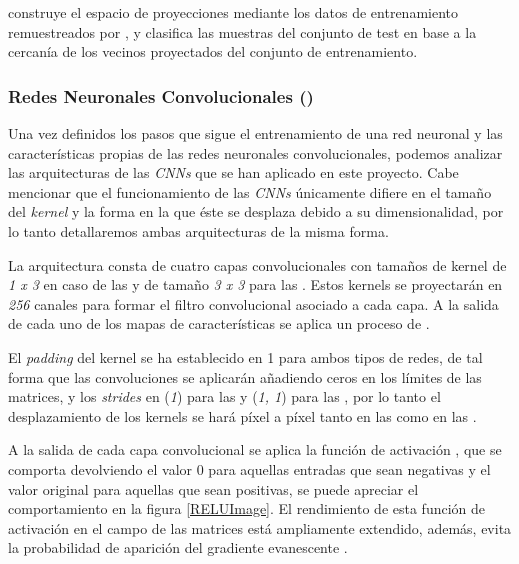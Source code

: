              construye el espacio de proyecciones mediante los datos de entrenamiento remuestreados por , y clasifica las muestras del conjunto de test en base a la cercanía de los vecinos proyectados del conjunto de entrenamiento.


        \subsubsection{Redes Neuronales Convolucionales ()}

            Una vez definidos los pasos que sigue el entrenamiento de una red neuronal y las características propias de las redes neuronales convolucionales, podemos analizar las arquitecturas de las \textit{CNNs} que se han aplicado en este proyecto. Cabe mencionar que el funcionamiento de las \textit{CNNs} únicamente difiere en el tamaño del \textit{kernel} y la forma en la que éste se desplaza debido a su dimensionalidad, por lo tanto detallaremos ambas arquitecturas de la misma forma.

            La arquitectura consta de cuatro capas convolucionales con tamaños de kernel de \textit{1 x 3} en caso de las  y de tamaño \textit{3 x 3} para las . Estos kernels se proyectarán en \textit{256} canales para formar el filtro convolucional asociado a cada capa. A la salida de cada uno de los mapas de características se aplica un proceso de .

            El \textit{padding} del kernel se ha establecido en 1 para ambos tipos de redes, de tal forma que las convoluciones se aplicarán añadiendo ceros en los límites de las matrices, y los \textit{strides} en (\textit{1}) para las  y (\textit{1, 1}) para las , por lo tanto el desplazamiento de los kernels se hará píxel a píxel tanto en las  como en las .

            A la salida de cada capa convolucional se aplica la función de activación , que se comporta devolviendo el valor $0$ para aquellas entradas que sean negativas y el valor original para aquellas que sean positivas, se puede apreciar el comportamiento en la figura \eqref{RELUImage}. El rendimiento de esta función de activación en el campo de las matrices está ampliamente extendido, además, evita la probabilidad de aparición del gradiente evanescente \cite{GradientVanishingRelu}.

